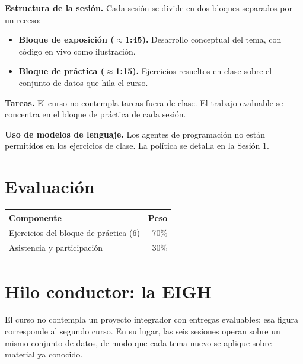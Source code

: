 \documentclass[11pt,letterpaper]{article}
\newcommand{\blue}[1]{{\color{cerulean}#1}}
\newcommand{\orange}[1]{{\color{redorange}#1}}
\begin{document}
\textbf{Estructura de la sesión.} Cada sesión se divide en dos bloques separados por un receso:

\begin{itemize}[leftmargin=*]
    \item \textbf{\blue{Bloque de exposición} ($\approx$1:45).} Desarrollo conceptual del tema, con código en vivo como ilustración.
    \item \textbf{\orange{Bloque de práctica} ($\approx$1:15).} Ejercicios resueltos en clase sobre el conjunto de datos que hila el curso.
\end{itemize}

\textbf{Tareas.} El curso no contempla tareas fuera de clase. El trabajo evaluable se concentra en el bloque de práctica de cada sesión.

\textbf{Uso de modelos de lenguaje.} Los agentes de programación no están permitidos en los ejercicios de clase. La política se detalla en la Sesión 1.

\section{Evaluación}

\begin{center}
\begin{tabular}{lr}
\toprule
\textbf{Componente} & \textbf{Peso} \\
\midrule
Ejercicios del bloque de práctica (6)  & 70\% \\
Asistencia y participación             & 30\% \\
\bottomrule
\end{tabular}
\end{center}

\section{Hilo conductor: la EIGH}

El curso no contempla un proyecto integrador con entregas evaluables; esa figura corresponde al segundo curso. En su lugar, las seis sesiones operan sobre un mismo conjunto de datos, de modo que cada tema nuevo se aplique sobre material ya conocido.
\end{document}
